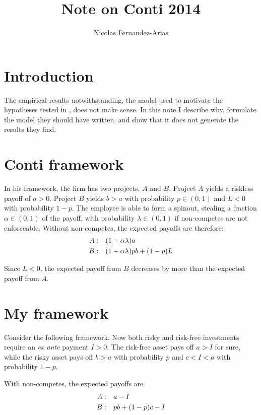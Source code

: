 \documentclass[12pt,english]{article}
\theoremstyle{remark}
\begin{document}
	
\title{Note on Conti 2014}
\author{Nicolas Fernandez-Arias}
\maketitle

\section{Introduction}

The empirical results notwithstanding, the model used to motivate the hypotheses tested in \cite{conti_non-competition_2014}, does not make sense. In this note I describe why, formulate the model they should have written, and show that it does not generate the results they find.

\section{Conti framework}

In his framework, the firm has two projects, $A$ and $B$. Project $A$ yields a riskless payoff of $a > 0$. Project $B$ yields $b > a$ with probability $p \in (0,1)$ and $L < 0$ with probability $1-p$. The employee is able to form a spinout, stealing a fraction $\alpha \in (0,1)$ of the payoff, with probability $\lambda \in (0,1)$ if non-competes are not enforceable. Without non-competes, the expected payoffs are therefore:
\begin{align*}
	A:&\textrm{ \space \space} (1-\alpha\lambda) a \\
	B:&\textrm{ \space \space} (1-\alpha\lambda) p b + (1-p) L 
\end{align*}

Since $L < 0$, the expected payoff from $B$ decreases by more than the expected payoff from $A$. 

\section{My framework}

Consider the following framework. Now both risky and risk-free investments require an \textit{ex ante} payment $I > 0$. The risk-free asset pays off $a > I$ for sure, while the risky asset pays off $b > a$ with probability $p$ and $c < I < a$ with probability $1-p$. 

With non-competes, the expected payoffs are
\begin{align*}
	A:&\textrm{ \space \space} a - I \\
	B:&\textrm{ \space \space} pb + (1-p)c - I
\end{align*}
\end{document}
